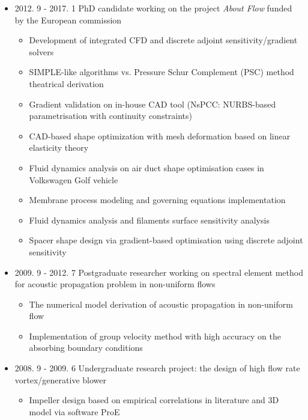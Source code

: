 \documentclass[letterpaper]{article}
\begin{document}
\begin{itemize}
\item 2012. 9 - 2017. 1  \hspace{2pt} PhD candidate working on the project \textit{About Flow} funded by the European commission
		\begin{itemize}
		\item Development of integrated CFD and discrete adjoint sensitivity/gradient solvers
		\item	SIMPLE-like algorithms vs. Pressure Schur Complement (PSC) method theatrical derivation
		\item Gradient validation on in-house CAD tool (NsPCC: NURBS-based parametrisation with continuity constraints)	
		\item	CAD-based shape optimization with mesh deformation based on linear elasticity theory
		\item	Fluid dynamics analysis on air duct shape optimisation cases in Volkswagen Golf vehicle
		\item	Membrane process modeling and governing equations implementation
		\item	Fluid dynamics analysis and filaments surface sensitivity analysis
		\item Spacer shape design via gradient-based optimisation using discrete adjoint sensitivity
		\end{itemize}
		
\item 2009. 9 - 2012. 7  \hspace{2pt} Postgraduate researcher working on spectral element method for acoustic propagation problem in non-uniform flows
		\begin{itemize}
		\item	The numerical model derivation of acoustic propagation in non-uniform flow
		\item	Implementation of group velocity method with high accuracy on the absorbing boundary conditions
		\end{itemize}

\item 2008. 9 - 2009. 6  \hspace{2pt} Undergraduate research project: the design of high flow rate vortex/generative blower
		\begin{itemize}
		\item Impeller design based on empirical correlations in literature and 3D model via software ProE
		\end{itemize}
		
\end{itemize}
\end{document}
